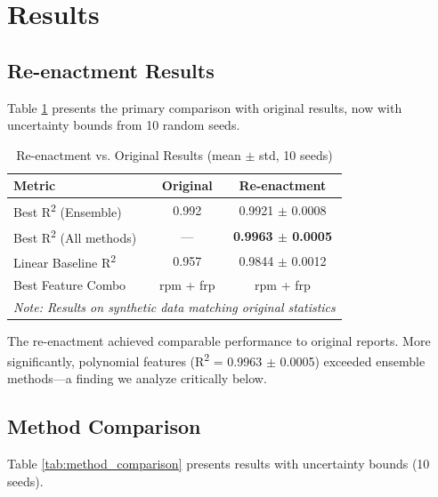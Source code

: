 \documentclass[conference]{IEEEtran}
\begin{document}
\section{Results}

\subsection{Re-enactment Results}

Table \ref{tab:main_results} presents the primary comparison with original results, now with uncertainty bounds from 10 random seeds.

\begin{table}[htbp]
\caption{Re-enactment vs. Original Results (mean $\pm$ std, 10 seeds)}
\label{tab:main_results}
\centering
\begin{tabular}{lcc}
\toprule
\textbf{Metric} & \textbf{Original} & \textbf{Re-enactment} \\
\midrule
Best R\textsuperscript{2} (Ensemble) & 0.992 & 0.9921 $\pm$ 0.0008 \\
Best R\textsuperscript{2} (All methods) & --- & \textbf{0.9963 $\pm$ 0.0005} \\
Linear Baseline R\textsuperscript{2} & 0.957 & 0.9844 $\pm$ 0.0012 \\
Best Feature Combo & rpm + frp & rpm + frp \\
\midrule
\multicolumn{3}{l}{\textit{Note: Results on synthetic data matching original statistics}} \\
\bottomrule
\end{tabular}
\end{table}

The re-enactment achieved comparable performance to original reports. More significantly, polynomial features (R\textsuperscript{2} = 0.9963 $\pm$ 0.0005) exceeded ensemble methods---a finding we analyze critically below.

\subsection{Method Comparison}

Table \ref{tab:method_comparison} presents results with uncertainty bounds (10 seeds).
\end{document}
